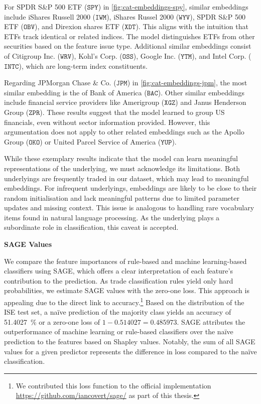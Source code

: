 For SPDR S\&P 500 ETF ($\mathtt{SPY}$) in \cref{fig:cat-embeddings-spy}, similar embeddings include iShares Russell 2000 ($\mathtt{IWM}$), iShares Russel 2000 ($\mathtt{WYV}$), SPDR S\&P 500 ETF ($\mathtt{OBV}$), and Direxion shares ETF ($\mathtt{XDT}$). This aligns with the intuition that \glspl{ETF} track identical or related indices. The model distinguishes \glspl{ETF} from other securities based on the feature issue type. Additional similar embeddings consist of Citigroup Inc. ($\mathtt{WRV}$), Kohl's Corp. ($\mathtt{OSS}$), Google Inc. ($\mathtt{YTM}$), and Intel Corp. ($\mathtt{INTC}$), which are long-term index constituents.

Regarding JPMorgan Chase \& Co. ($\mathtt{JPM}$) in \cref{fig:cat-embeddings-jpm}, the most similar embedding is the of Bank of America ($\mathtt{BAC}$). Other similar embeddings include financial service providers like Amerigroup ($\mathtt{XGZ}$) and Janus Henderson Group ($\mathtt{ZPR}$). These results suggest that the model learned to group US financials, even without sector information provided. However, this argumentation does not apply to other related embeddings such as the Apollo Group ($\mathtt{OKO}$) or United Parcel Service of America ($\mathtt{YUP}$). %

While these exemplary results indicate that the model can learn meaningful representations of the underlying, we must acknowledge its limitations. Both underlyings are frequently traded in our dataset, which may lead to meaningful embeddings. For infrequent underlyings, embeddings are likely to be close to their random initialisation and lack meaningful patterns due to limited parameter updates and missing context. This issue is analogous to handling rare vocabulary items found in natural language processing. As the underlying plays a subordinate role in classification, this caveat is accepted.

\textbf{SAGE Values}

We compare the feature importances of rule-based and machine learning-based classifiers using \gls{SAGE}, which offers a clear interpretation of each feature's contribution to the prediction. As trade classification rules yield only hard probabilities, we estimate \gls{SAGE} values with the zero-one loss. This approach is appealing due to the direct link to accuracy.\footnote{We contributed this loss function to the official implementation \url{https://github.com/iancovert/sage/} as part of this thesis.} Based on the distribution of the \gls{ISE} test set, a na\"ive prediction of the majority class yields an accuracy of \SI{51.4027}{\percent} or a zero-one loss of $1- \num{0.514027} = \num{0.485973}$. \gls{SAGE} attributes the outperformance of machine learning or rule-based classifiers over the na\"ive prediction to the features based on Shapley values. Notably, the sum of all \gls{SAGE} values for a given predictor represents the difference in loss compared to the na\"ive classification.


